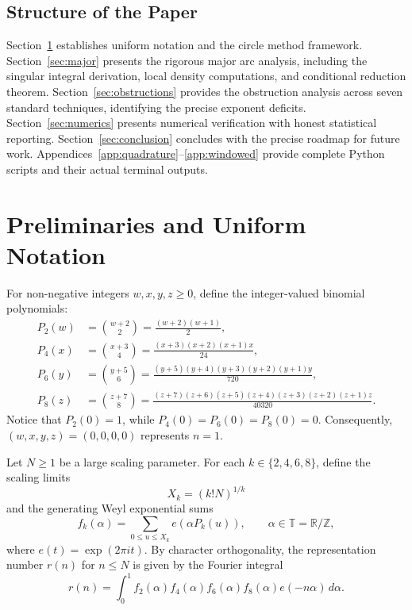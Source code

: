 \documentclass[11pt, a4paper]{article}
\theoremstyle{plain}
\theoremstyle{definition}
\begin{document}
\subsection{Structure of the Paper}
Section~\ref{sec:prelim} establishes uniform notation and the circle method framework. Section~\ref{sec:major} presents the rigorous major arc analysis, including the singular integral derivation, local density computations, and conditional reduction theorem. Section~\ref{sec:obstructions} provides the obstruction analysis across seven standard techniques, identifying the precise exponent deficits. Section~\ref{sec:numerics} presents numerical verification with honest statistical reporting. Section~\ref{sec:conclusion} concludes with the precise roadmap for future work. Appendices~\ref{app:quadrature}--\ref{app:windowed} provide complete Python scripts and their actual terminal outputs.

\section{Preliminaries and Uniform Notation}
\label{sec:prelim}

For non-negative integers $w,x,y,z \geq 0$, define the integer-valued binomial polynomials:
\begin{align}
P_2(w) &= \binom{w+2}{2} = \frac{(w+2)(w+1)}{2},\\
P_4(x) &= \binom{x+3}{4} = \frac{(x+3)(x+2)(x+1)x}{24},\\
P_6(y) &= \binom{y+5}{6} = \frac{(y+5)(y+4)(y+3)(y+2)(y+1)y}{720},\\
P_8(z) &= \binom{z+7}{8} = \frac{(z+7)(z+6)(z+5)(z+4)(z+3)(z+2)(z+1)z}{40320}.
\end{align}
Notice that $P_2(0)=1$, while $P_4(0)=P_6(0)=P_8(0)=0$. Consequently, $(w,x,y,z)=(0,0,0,0)$ represents $n=1$.

Let $N \geq 1$ be a large scaling parameter. For each $k \in \{2,4,6,8\}$, define the scaling limits
\begin{equation}
X_k = (k! N)^{1/k}
\end{equation}
and the generating Weyl exponential sums
\begin{equation}
f_k(\alpha) = \sum_{0 \leq u \leq X_k} e(\alpha P_k(u)), \qquad \alpha \in \mathbb{T} = \mathbb{R}/\mathbb{Z},
\end{equation}
where $e(t) = \exp(2\pi i t)$. By character orthogonality, the representation number $r(n)$ for $n \leq N$ is given by the Fourier integral
\begin{equation}\label{eq:fourier_integral}
r(n) = \int_0^1 f_2(\alpha) f_4(\alpha) f_6(\alpha) f_8(\alpha) e(-n\alpha)\,d\alpha.
\end{equation}
\end{document}
